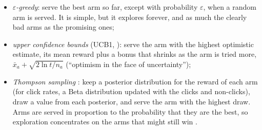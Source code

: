 \begin{itemize}
  \item \emph{$\varepsilon$-greedy}: serve the best arm so far, except with probability $\varepsilon$, when a random arm is served. It is simple,
        but it explores forever, and as much the clearly bad arms as the promising ones;
  \item \emph{upper confidence bounds} (UCB1, \citealp{auer2002finite}): serve the arm with the highest optimistic estimate, its mean reward
        plus a bonus that shrinks as the arm is tried more, $\bar x_a+\sqrt{2\ln t/n_a}$ (``optimism in the face of uncertainty'');
  \item \emph{Thompson sampling} \citep{thompson1933likelihood,chapelle2011empirical,russo2018tutorial}: keep a posterior distribution for the
        reward of each arm (for click rates, a Beta distribution updated with the clicks and non-clicks), draw a value from each posterior,
        and serve the arm with the highest draw. Arms are served in proportion to the probability that they are the best, so exploration
        concentrates on the arms that might still win \citep{scott2010modern}.
\end{itemize}

